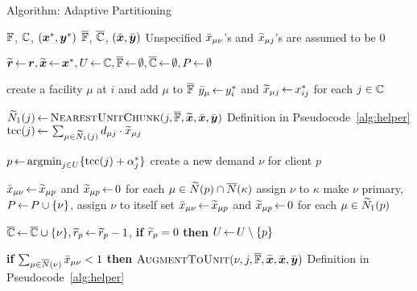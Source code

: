 \documentclass[11pt]{article}
\begin{document}
\begin{algorithm}[ht]
  \caption{Algorithm: Adaptive Partitioning}
  \label{alg:lpr2}
  \begin{algorithmic}[1]
    \Require $\mathbb{F}$, $\mathbb{C}$, $(\boldsymbol{x}^\ast,\boldsymbol{y}^\ast)$
    \Ensure  $\overline{\mathbb{F}}$,  $\overline{\mathbb{C}}$, $(\bar{\boldsymbol{x}}, \bar{\boldsymbol{y}})$ 
    \Comment Unspecified ${\bar x}_{\mu \nu}$'s and ${\widetilde x}_{\mu j}$'s are assumed to be $0$

    \State $\widetilde{\boldsymbol{r}} {\,\leftarrow\,} \boldsymbol{r}, \widetilde{\boldsymbol{x}} {\,\leftarrow\,}
    \boldsymbol{x}^\ast, U{\,\leftarrow\,} \mathbb{C}, \overline{\mathbb{F}}{\,\leftarrow\,} \emptyset,
    \overline{\mathbb{C}}{\,\leftarrow\,} \emptyset, P{\,\leftarrow\,} \emptyset$

    \State create a facility $\mu$ at $i$ and add $\mu$ to $\overline{\mathbb{F}}$
    \State ${\bar y}_\mu {\,\leftarrow\,} y_i^\ast$ and ${\widetilde x}_{\mu j}{\,\leftarrow\,}
    x_{ij}^\ast$ for each $j\in\mathbb{C}$ 
    \EndFor

    \State ${\widetilde N}_1(j) {\,\leftarrow\,} {{\textsc{NearestUnitChunk}}}(j, \overline{\mathbb{F}}, \widetilde{\boldsymbol{x}}, \bar{\boldsymbol{x}}, \bar{\boldsymbol{y}})$ \Comment Definition in Pseudocode~\ref{alg:helper}
    \State $\textrm{tcc}(j){\,\leftarrow\,} \sum_{\mu\in {\widetilde N}_1(j)} d_{{\mu}j}\cdot {\widetilde x}_{\mu j}$
    \EndFor
 
    \State $p {\,\leftarrow\,} {{\mbox{\rm argmin}}}_{j\in U}\{ \textrm{tcc}(j)+\alpha_j^\ast \}$
    \State create a new demand $\nu$ for client $p$

    \State ${\bar x}_{\mu \nu}{\,\leftarrow\,} {\widetilde x}_{\mu p}$ and ${\widetilde x}_{\mu p}{\,\leftarrow\,} 0$ for each $\mu \in {\widetilde N}(p) \cap {\overline{N}}(\kappa)$
	\State assign $\nu$ to $\kappa$
    \Else 
    \State make $\nu$ primary, $P {\,\leftarrow\,} P \cup \{\nu\}$, assign $\nu$ to itself
    \State set ${\bar x}_{\mu\nu} {\,\leftarrow\,} {\widetilde x}_{\mu p}$ and ${\widetilde x}_{\mu p}{\,\leftarrow\,} 0$ for each $\mu\in {\widetilde N}_1(p)$

    \EndIf
    \State $\overline{\mathbb{C}}{\,\leftarrow\,} \overline{\mathbb{C}}\cup \{\nu\},
    {\widetilde r}_p {\,\leftarrow\,} {\widetilde r}_p -1$, 
	\State \textbf{if} {${\widetilde r}_p=0$} \textbf{then} $U{\,\leftarrow\,} U \setminus \{p\}$
    \EndWhile

        
    \State \textbf{if} $\sum_{\mu\in {\overline{N}}(\nu)}{\bar x}_{\mu\nu}<1$
    \textbf{then} ${\textsc{AugmentToUnit}}(\nu, j, \overline{\mathbb{F}}, \widetilde{\boldsymbol{x}}, \bar{\boldsymbol{x}}, \bar{\boldsymbol{y}})$ \Comment Definition in Pseudocode~\ref{alg:helper}
    \EndFor
    \EndFor
  \end{algorithmic}
\end{algorithm}
\end{document}
